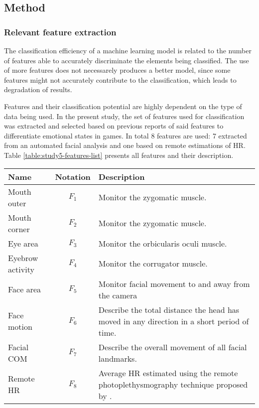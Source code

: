 \subsection{Method}

\subsubsection{Relevant feature extraction}

The classification efficiency of a machine learning model is related to the number of features able to accurately discriminate the elements being classified. The use of more features does not necessarely produces a better model, since some features might not accurately contribute to the classification, which leads to degradation of results.

Features and their classification potential are highly dependent on the type of data being used. In the present study, the set of features used for classification was extracted and selected based on previous reports of said features to differentiate emotional states in games. In total 8 features are used: 7 extracted from an automated facial analysis and one based on remote estimations of HR. Table \ref{table:study5-features-list} presents all features and their description.

\begin{table*}
    \centering
    \caption{Classification features}
    \label{table:study5-features-list}
    \begin{tabular}[l]{@{}lcp{6.5cm}}
        \hline
            \textbf{Name} & \textbf{Notation} & \textbf{Description} \\
        \hline
            Mouth outer & $F_1$ & Monitor the zygomatic muscle.  \\
            Mouth corner & $F_2$ & Monitor the zygomatic muscle. \\
            Eye area & $F_3$ & Monitor the orbicularis oculi muscle. \\
            Eyebrow activity & $F_4$ & Monitor the corrugator muscle.  \\
            Face area & $F_5$ & Monitor facial movement to and away from the camera  \\
            Face motion & $F_6$ & Describe the total distance the head has moved in any direction in a short period of time.  \\
            Facial COM & $F_7$ & Describe the overall movement of all facial landmarks. \\
            Remote HR & $F_8$ & Average HR estimated using the remote photoplethysmography technique proposed by \textcite{poh2011advancements}.  \\
        \hline
    \end{tabular}
\end{table*}

